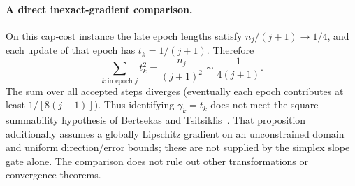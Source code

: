 \paragraph{A direct inexact-gradient comparison.}
On this cap-cost instance the late epoch lengths satisfy $n_j/(j+1)\to1/4$, and each update of that epoch has $t_k=1/(j+1)$. Therefore
\[
 \sum_{k\text{ in epoch }j}t_k^2
 =\frac{n_j}{(j+1)^2}\sim\frac1{4(j+1)}.
\]
The sum over all accepted steps diverges (eventually each epoch contributes at least $1/[8(j+1)]$). Thus identifying $\gamma_k=t_k$ does not meet the square-summability hypothesis of Bertsekas and Tsitsiklis~\cite[Proposition~1]{bertsekas2000}. That proposition additionally assumes a globally Lipschitz gradient on an unconstrained domain and uniform direction/error bounds; these are not supplied by the simplex slope gate alone. The comparison does not rule out other transformations or convergence theorems.
